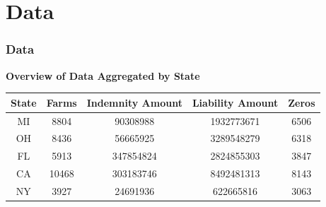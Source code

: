 \documentclass[serif,10pt,aspectratio=169]{beamer}
\begin{document}
\section{Data}
\begin{frame}
\frametitle{Data}
\textbf{Overview of Data Aggregated by State}
\begin{center}
\par 
\begin{tabular}{||c|c|c|c|c||}
\hline
\textbf{State}& \textbf{Farms}& \textbf{Indemnity Amount} & \textbf{Liability Amount} & \textbf{Zeros}\\
\hline
\hline
MI & 8804  &  90308988 & 1932773671 & 6506 \\
OH & 8436  &  56665925 & 3289548279 & 6318 \\
FL & 5913  & 347854824 & 2824855303 & 3847 \\
CA & 10468 & 303183746 & 8492481313 & 8143 \\
NY & 3927  &  24691936 &  622665816 & 3063 \\
\hline
\end{tabular}
\end{center}
\end{frame}
\end{document}
